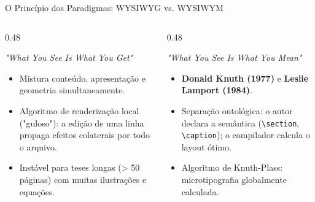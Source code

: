 \documentclass[aspectratio=169, 10pt]{beamer}
\begin{document}
\begin{frame}{O Princípio dos Paradigmas: WYSIWYG vs. WYSIWYM}
  \begin{columns}[T]
    \begin{column}{0.48\textwidth}
      \begin{tcolorbox}[colback=red!5,colframe=iffred,title=\textbf{WYSIWYG: Microsoft Word}]
        \textit{"What You See Is What You Get"}
        \begin{itemize}
          \item Mistura conteúdo, apresentação e geometria simultaneamente.
          \item Algoritmo de renderização local ("guloso"): a edição de uma linha propaga efeitos colaterais por todo o arquivo.
          \item Instável para teses longas (> 50 páginas) com muitas ilustrações e equações.
        \end{itemize}
      \end{tcolorbox}
    \end{column}

    \begin{column}{0.48\textwidth}
      \begin{tcolorbox}[colback=iffgreenlight,colframe=iffgreen,title=\textbf{WYSIWYM: O Sistema \LaTeX}]
        \textit{"What You See Is What You Mean"}
        \begin{itemize}
          \item \textbf{Donald Knuth (1977)} e \textbf{Leslie Lamport (1984)}.
          \item Separação ontológica: o autor declara a semântica (\texttt{\textbackslash section}, \texttt{\textbackslash caption}); o compilador calcula o layout ótimo.
          \item Algoritmo de Knuth-Plass: microtipografia globalmente calculada.
        \end{itemize}
      \end{tcolorbox}
    \end{column}
  \end{columns}
\end{frame}
\end{document}
